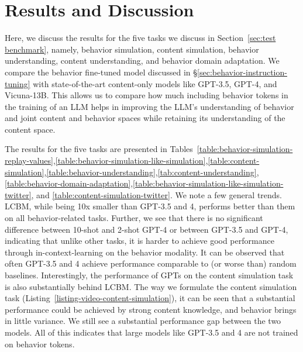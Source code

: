 \section{Results and Discussion}
\label{sec:results}
Here, we discuss the results for the five tasks we discuss in Section~\ref{sec:test benchmark}, namely, behavior simulation, content simulation, behavior understanding, content understanding, and behavior domain adaptation. We compare the behavior fine-tuned model discussed in \S\ref{sec:behavior-instruction-tuning} with state-of-the-art content-only models like GPT-3.5, GPT-4, and Vicuna-13B. This allows us to compare how much including behavior tokens in the training of an LLM helps in improving the LLM's understanding of behavior and joint content and behavior spaces while retaining its understanding of the content space. 

The results for the five tasks are presented in Tables~\ref{table:behavior-simulation-replay-values},\ref{table:behavior-simulation-like-simulation},\ref{table:content-simulation},\ref{table:behavior-understanding},\ref{tab:content-understanding}, \ref{table:behavior-domain-adaptation},\ref{table:behavior-simulation-like-simulation-twitter}, and \ref{table:content-simulation-twitter}. We note a few general trends. LCBM, while being 10x smaller than GPT-3.5 and 4, performs better than them on all behavior-related tasks. Further, we see that there is no significant difference between 10-shot and 2-shot GPT-4 or between GPT-3.5 and GPT-4, indicating that unlike other tasks, it is harder to achieve good performance through in-context-learning on the behavior modality. It can be observed that often GPT-3.5 and 4 achieve performance comparable to (or worse than) random baselines. Interestingly, the performance of GPTs on the content simulation task is also substantially behind LCBM. The way we formulate the content simulation task (Listing~\ref{listing-video-content-simulation}), it can be seen that a substantial performance could be achieved by strong content knowledge, and behavior brings in little variance. We still see a substantial performance gap between the two models. All of this indicates that large models like GPT-3.5 and 4 are not trained on behavior tokens. 


